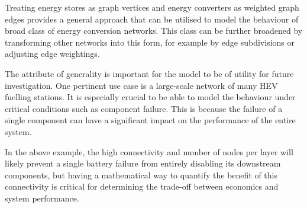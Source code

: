 \documentclass[]{article}
\def\nstyle{int(\lay<\Nnodlen?min(2,\lay):3)} %
\numberwithin{equation}{section}
\theoremstyle{plain} %
\theoremstyle{definition}
\theoremstyle{remark}
\begin{document}
Treating energy stores as graph vertices and energy converters as weighted graph edges
provides a general approach that can be utilised to model the behaviour of broad class of energy conversion networks.
This class can be further broadened by transforming other networks into this form,
for example by edge subdivisions or adjusting edge weightings.

The attribute of generality is important for the model to be of utility for future investigation.
One pertinent use case is a large-scale network of many HEV fuelling stations.
It is especially crucial to be able to model the behaviour under critical conditions such as component failure.
This is because the failure of a single component can have a significant impact on the performance of the entire system.

\begin{center}
\end{center}

In the above example, the high connectivity and number of nodes per layer will likely prevent a single battery failure from entirely disabling its downstream components,
but having a mathematical way to quantify the benefit of this connectivity
is critical for determining the trade-off between economics and system performance.
\end{document}

